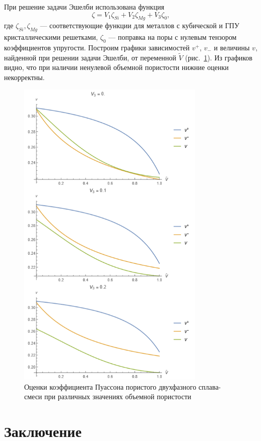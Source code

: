 \documentclass[12pt, a4paper]{article}
\begin{document}
При решение задачи Эшелби использована функция
\[
\zeta = V_1 \zeta_{Si} + V_2 \zeta_{Mg} + V_3 \zeta_0,
\]
где $\zeta_{Si}, \zeta_{Mg}$ --- соответствующие функции для металлов с кубической и ГПУ кристаллическими решетками, $\zeta_0$ --- поправка на поры с нулевым тензором коэффициентов
упругости.
Построим графики зависимостей $v^{+}$, $v_{-}$ и величины $v$, найденной при решении
задачи Эшелби, от переменной $\tilde{V}$ (рис.~\ref{puasson-pic-3}).
Из графиков видно, что при наличии ненулевой объемной пористости нижние оценки некорректны.
\begin{figure}[!htbp]
	\centering
	\includegraphics[width=0.8\textwidth]{pic-3}%
	\caption{Оценки коэффициента Пуассона пористого двухфазного сплава-смеси при различных значениях объемной пористости}
	\vspace*{-2mm}
	\label{puasson-pic-3}
\end{figure}

\newpage
\section{Заключение}
\end{document}
